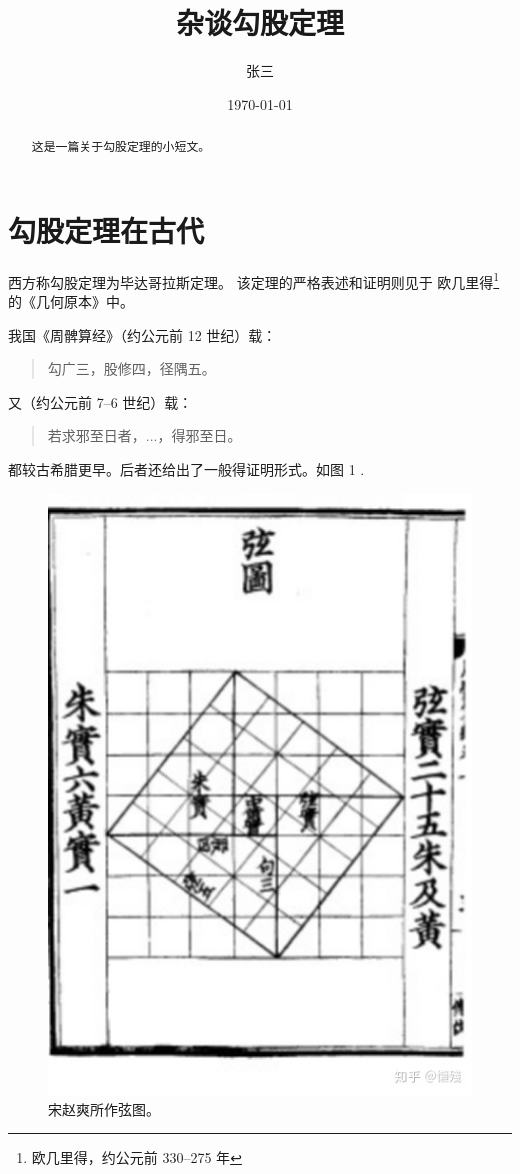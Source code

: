 \documentclass[UTF8]{ctexart}
\title{杂谈勾股定理}
\author{张三}
\date{\today}
\begin{document}
    \maketitle

    \begin{abstract}
        这是一篇关于勾股定理的小短文。
    \end{abstract}

    \tableofcontents
    
    \section{勾股定理在古代}
        西方称勾股定理为毕达哥拉斯定理\cite{Kline}。
        该定理的严格表述和证明则见于
        欧几里得\footnote{欧几里得，约公元前 330--275 年}
        的《几何原本》中。

        我国《周髀算经》（约公元前 12 世纪）载：
        \begin{quote}
            \kaishu
            勾广三，股修四，径隅五。
        \end{quote}
        又（约公元前 7--6 世纪）载：
        \begin{quote}
            \kaishu
            若求邪至日者，...，得邪至日。
        \end{quote}
        都较古希腊更早。后者还给出了一般得证明形式。如图 1 \cite{quanjing}.
        \\[5pt]

        \begin{figure}[ht]
            \centering
            \includegraphics[scale=0.5]{xiantu.jpg}
            \caption{宋赵爽所作弦图。}
        \end{figure}
\end{document}
